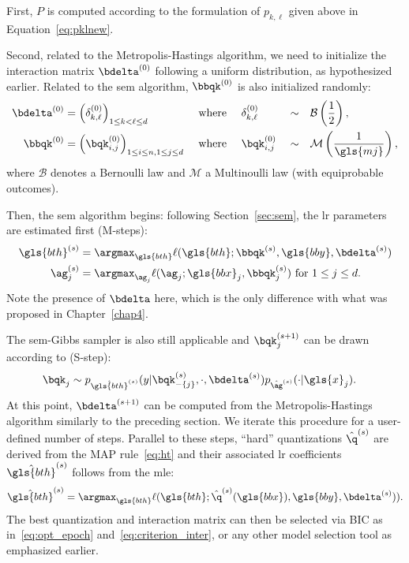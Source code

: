 First, $P$ is computed according to the formulation of $p_{k,\ell}$ given above in Equation~\eqref{eq:pklnew}.

Second, related to the Metropolis-Hastings algorithm, we need to initialize the interaction matrix $\bdelta^{(0)}$ following a uniform distribution, as hypothesized earlier. Related to the \gls{sem} algorithm, $\bbqk^{(0)}$ is also initialized randomly:
\begin{alignat*}{5}
\bdelta^{(0)} & = \left( \delta^{(0)}_{k,\ell} \right)_{1 \leq k < \ell \leq d} && \text{ where } && \delta^{(0)}_{k,\ell} && \sim && \mathcal{B} \left( \frac{1}{2} \right), \\
\bbqk^{(0)} & = \left( \bqk^{(0)}_{i,j} \right)_{1 \leq i \leq n, 1 \leq j \leq d} && \text{ where } && \bqk^{(0)}_{i,j} && \sim && \mathcal{M} \left( \frac{1}{\gls{mj}} \right),
\end{alignat*}
where $\mathcal{B}$ denotes a Bernoulli law and $\mathcal{M}$ a Multinoulli law (with equiprobable outcomes).

Then, the \gls{sem} algorithm begins: following Section~\ref{sec:sem}, the \gls{lr} parameters are estimated first (M-steps):
\begin{align*}
{\gls{bth}}^{(s)} & = \argmax_{\gls{bth}} \ell(\gls{bth} ; \bbqk^{(s)}, \gls{bby}, \bdelta^{(s)}) \\
{\ag}_j^{(s)} & = \argmax_{\ag_j} \ell(\ag_j ; \gls{bbx}_j, \bbqk^{(s)}_j) \text{ for } 1 \leq j \leq d.
\end{align*}
Note the presence of $\bdelta$ here, which is the only difference with what was proposed in Chapter~\ref{chap4}.

The \gls{sem}-Gibbs sampler is also still applicable and $\bqk_j^{(s+1)}$ can be drawn according to (S-step): 
\begin{align*}
\bqk_j & \sim p_{\hat{\gls{bth}}^{(s)}}(y | \bqk_{-\{j\}}^{(s)}, \cdot, \bdelta^{(s)}) p_{\hat{\ag}^{(s)}}(\cdot | \gls{x}_j).
\end{align*}
At this point, $\bdelta^{(s+1)}$ can be computed from the Metropolis-Hastings algorithm similarly to the preceding section. We iterate this procedure for a user-defined number of steps. Parallel to these steps, ``hard'' quantizations $\hat{\q}^{(s)}$ are derived from the MAP rule~\eqref{eq:ht} and their associated \gls{lr} coefficients $\hat{\gls{bth}}^{(s)}$ follows from the \gls{mle}:
\[\hat{\gls{bth}}^{(s)} = \argmax_{\gls{bth}} \ell(\gls{bth}; \hat{\q}^{(s)}(\gls{bbx}), \gls{bby}, \bdelta^{(s)})).\]
The best quantization and interaction matrix can then be selected via BIC as in~\eqref{eq:opt_epoch} and~\eqref{eq:criterion_inter}, or any other model selection tool as emphasized earlier.

